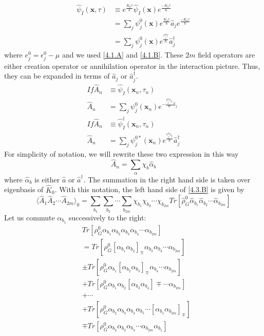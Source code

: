 \begin{equation}
\begin{aligned}
\hat{\psi}_I(\mathbf{x},\tau)&\equiv e^\frac{K_0\tau}{\hbar}\hat{\psi}_I(\mathbf{x})e^\frac{-K_0\tau}{\hbar}\\
&=\sum_j\psi_j^0(\mathbf{x})e^\frac{K_0\tau}{\hbar} \hat{a}_j e^\frac{-K_0\tau}{\hbar}\\
&=\sum_j\psi_j^0(\mathbf{x}) e^\frac{e_j^0\tau}{\hbar} \hat{a}_j^\dagger
\end{aligned}
\end{equation}
where $e_j^0=\epsilon_j^0-\mu$ and we used \ref{4.1.A} and \ref{4.1.B}.
These $2m$ field operators are either creation operator or annihilation operator in the interaction picture.
Thus, they can be expanded in terms of $\hat{a}_j$ or $\hat{a}_j^\dagger$.
$$
\begin{aligned}
If \hat{A}_n &\equiv \hat{\psi}_I(\mathbf{x}_n,\tau_n)\\
\hat{A}_n&=\sum_j \psi_j^0(\mathbf{x}_n) e^{-\frac{\epsilon_j^0\tau_n}{\hbar} \hat{a}_j}\\
If \hat{A}_n &\equiv \hat{\psi}^\dagger_I(\mathbf{x}_n,\tau_n)\\
\hat{A}_n&=\sum_j \psi_j^{0*}(\mathbf{x}_n) e^\frac{\epsilon_j^0\tau_n}{\hbar} \hat{a}_j^\dagger
\end{aligned}
$$
For simplicity of notation, we will rewrite these two expression in this way
$$
\hat{A}_n=\sum_\alpha \chi_b\hat{\alpha}_b
$$
where $\hat{\alpha}_b$ is either $\hat{a}$ or $\hat{a}^\dagger$.
The summation in the right hand side is taken over eigenbasis of $\hat{K}_0$.
With this notation, the left hand side of \ref{4.3.B} is given by
\begin{equation}\label{4.3.C}
\langle\hat A_1 \hat A_2 \cdots \hat A_{2m}\rangle_0=\sum_{b_1}\sum_{b_2}\cdots\sum_{b_{2m}} \chi_{b_1}\chi_{b_2}\cdots\chi_{b_{2m}}Tr[\hat{\rho}_G^0\hat{\alpha}_{b_1} \hat{\alpha}_{b_2} \cdots \hat{\alpha}_{b_{2m}}]
\end{equation}
Let us commute $\alpha_{b_1}$ successively to the right:
$$
\begin{aligned}
&Tr[\rho_G^0\alpha_{b_1}\alpha_{b_2}\alpha_{b_3}\alpha_{b_4}\cdots\alpha_{b_{2m}}]\\
&=Tr[\rho_G^0[\alpha_{b_1}\alpha_{b_2}]_\mp\alpha_{b_3}\alpha_{b_4}\cdots\alpha_{b_{2m}}]\\
&\pm Tr[\rho_G^0\alpha_{b_1}[\alpha_{b_2}\alpha_{b_3}]_\mp\alpha_{b_4}\cdots\alpha_{b_{2m}}]\\
&+Tr[\rho_G^0\alpha_{b_1}\alpha_{b_2}[\alpha_{b_3}\alpha_{b_4}]\mp\cdots\alpha_{b_{2m}}]\\
&+\cdots\\
&+Tr[\rho_G^0\alpha_{b_2}\alpha_{b_3}\alpha_{b_4}\alpha_{b_5}\cdots[\alpha_{b_1}\alpha_{b_{2m}}]_\mp]\\
&\mp Tr[\rho_G^0\alpha_{b_2}\alpha_{b_3}\alpha_{b_4}\cdots\alpha_{b_{2m}}\alpha_{b_1}]
\end{aligned}
$$
